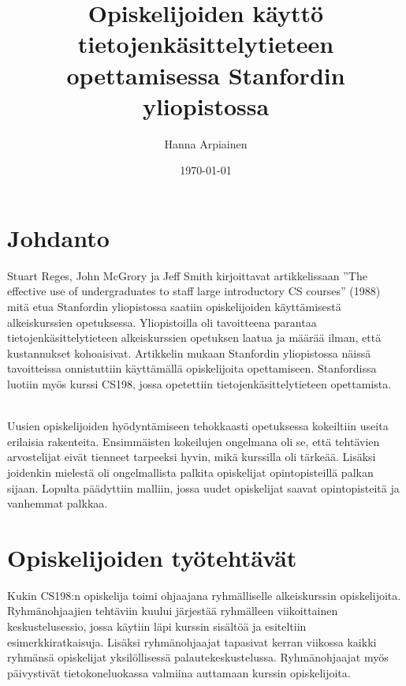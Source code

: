 \documentclass[finnish]{tktltiki2}
\title{﻿Opiskelijoiden käyttö tietojenkäsittelytieteen opettamisessa Stanfordin yliopistossa}
\author{Hanna Arpiainen}
\date{\today}
\theoremstyle{definition}
\theoremstyle{remark}
\begin{document}
\maketitle
\makeabstract

\tableofcontents
\newpage



\section{Johdanto}

Stuart Reges, John McGrory ja Jeff Smith kirjoittavat artikkelissaan ”The effective use of undergraduates to staff large introductory CS courses” (1988) mitä etua Stanfordin yliopistossa saatiin opiskelijoiden käyttämisestä alkeiskurssien opetuksessa. Yliopistoilla oli tavoitteena parantaa tietojenkäsittelytieteen alkeiskurssien opetuksen laatua ja määrää ilman, että kustannukset kohoaisivat. Artikkelin mukaan Stanfordin yliopistossa näissä tavoitteissa onnistuttiin käyttämällä opiskelijoita opettamiseen. Stanfordissa luotiin myös kurssi CS198, jossa opetettiin tietojenkäsittelytieteen opettamista.

\\

Uusien opiskelijoiden hyödyntämiseen tehokkaasti opetuksessa kokeiltiin useita erilaisia rakenteita. Ensimmäisten kokeilujen ongelmana oli se, että tehtävien arvostelijat eivät tienneet tarpeeksi hyvin, mikä kurssilla oli tärkeää. Lisäksi joidenkin mielestä oli ongelmallista palkita opiskelijat opintopisteillä palkan sijaan. Lopulta päädyttiin malliin, jossa uudet opiskelijat saavat opintopisteitä ja vanhemmat palkkaa.





\section{Opiskelijoiden työtehtävät}

Kukin CS198:n opiskelija toimi ohjaajana ryhmälliselle alkeiskurssin opiskelijoita. Ryhmänohjaajien tehtäviin kuului järjestää ryhmälleen viikoittainen keskustelusessio, jossa käytiin läpi kurssin sisältöä ja esiteltiin esimerkkiratkaisuja. Lisäksi ryhmänohjaajat tapasivat kerran viikossa kaikki ryhmänsä opiskelijat yksilöllisessä palautekeskustelussa. Ryhmänohjaajat myös päivystivät tietokoneluokassa valmiina auttamaan kurssin opiskelijoita.
\end{document}
